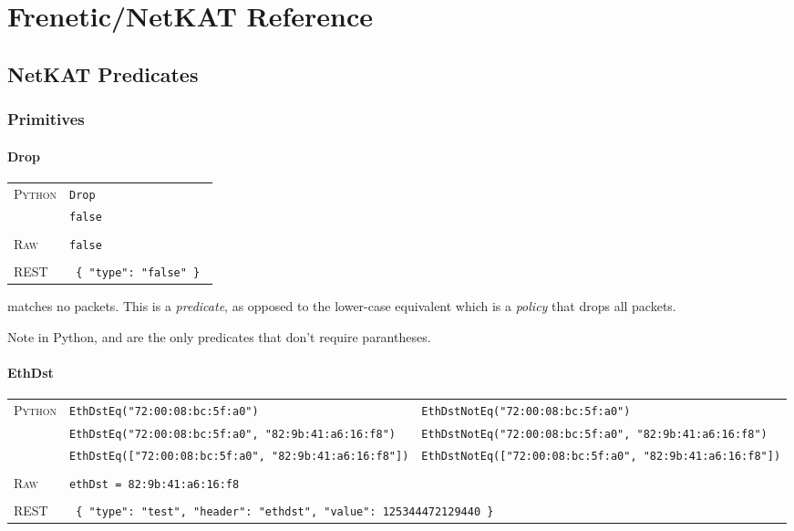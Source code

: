 
\chapter{Frenetic/NetKAT Reference}
\label{netkat_reference}

\section{NetKAT Predicates}
\label{netkat_reference:predicates}

\subsection{Primitives}

\subsubsection{Drop}

\bigskip
\begin{tabularx}{\linewidth}{lX}
\textsc{Python}   & \texttt{Drop} \\
   & \texttt{false} \\ \\
\textsc{Raw}    & \texttt{false}  \\ \\
\textsc{REST} & \texttt{ \{ "type": "false" \} } 
\end{tabularx}

 matches no packets.  This is a \emph{predicate}, as opposed to the lower-case 
equivalent  
which is a \emph{policy} that drops all packets. 

Note in Python,  and  are the only predicates that don't require parantheses.

\subsubsection{EthDst}

\bigskip
\begin{tabularx}{\linewidth}{lXX}
\textsc{Python}   & \texttt{EthDstEq("72:00:08:bc:5f:a0")}    & \texttt{EthDstNotEq("72:00:08:bc:5f:a0")} \\
    & \texttt{EthDstEq("72:00:08:bc:5f:a0", "82:9b:41:a6:16:f8")}  & \texttt{EthDstNotEq("72:00:08:bc:5f:a0", "82:9b:41:a6:16:f8")} \\
    & \texttt{EthDstEq(["72:00:08:bc:5f:a0", "82:9b:41:a6:16:f8"])}  & \texttt{EthDstNotEq(["72:00:08:bc:5f:a0", "82:9b:41:a6:16:f8"])} \\ \\
\textsc{Raw}    & \texttt{ethDst = 82:9b:41:a6:16:f8}     & \\ \\
\textsc{REST} & \multicolumn{2}{l}{\texttt{ \{ "type": "test", "header": "ethdst", "value": 125344472129440 \} }} 
\end{tabularx}

